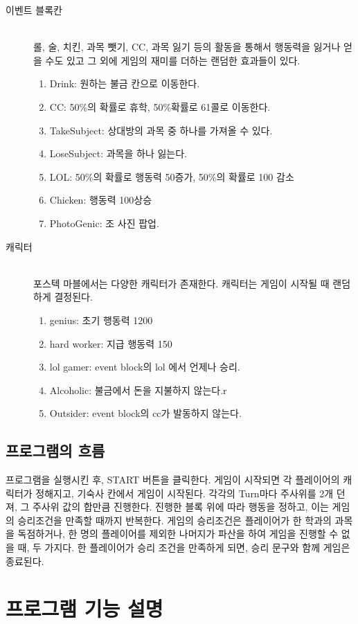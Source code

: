 \documentclass[10pt,oneside,a4paper,titlepage]{article}
\begin{document}
\begin{description}
\item[이벤트 블록칸] \hfill \\
롤, 술, 치킨, 과목 뺏기, CC, 과목 잃기 등의 활동을 통해서 행동력을 잃거나 얻을 수도 있고 그 외에 게임의 재미를 더하는 랜덤한 효과들이 있다.
\begin{enumerate}
\item Drink: 원하는 불금 칸으로 이동한다. 
\item CC: 50\%의 확률로 휴학, 50\%확률로 61콜로 이동한다.
\item TakeSubject: 상대방의 과목 중 하나를 가져올 수 있다.
\item LoseSubject: 과목을 하나 잃는다. 
\item LOL: 50\%의 확률로 행동력 50증가, 50\%의 확률로 100 감소
\item Chicken: 행동력 100상승
\item PhotoGenic: 조 사진 팝업.
\end{enumerate}


\item[캐릭터] \hfill \\
포스텍 마블에서는 다양한 캐릭터가 존재한다. 캐릭터는 게임이 시작될 때 랜덤하게 결정된다.
\begin{enumerate}
\item genius: 초기 행동력 1200
\item hard worker: 지급 행동력 150
\item lol gamer: event block의 lol 에서 언제나 승리.
\item Alcoholic: 불금에서 돈을 지불하지 않는다.r
\item Outsider: event block의 cc가 발동하지 않는다.
\end{enumerate}
\end{description}


\subsection{프로그램의 흐름}    
프로그램을 실행시킨 후, START 버튼을 클릭한다. 게임이 시작되면 각 플레이어의 캐릭터가 정해지고, 기숙사 칸에서 게임이 시작된다. 각각의 Turn마다 주사위를 2개 던져, 그 주사위 값의 합만큼 진행한다. 진행한 블록 위에 따라 행동을 정하고, 이는 게임의 승리조건을 만족할 때까지 반복한다. 게임의 승리조건은 플레이어가 한 학과의 과목을 독점하거나, 한 명의 플레이어를 제외한 나머지가 파산을 하여 게임을 진행할 수 없을 때, 두 가지다. 한 플레이어가 승리 조건을 만족하게 되면, 승리 문구와 함께 게임은 종료된다.

\section{프로그램 기능 설명}
\end{document}
